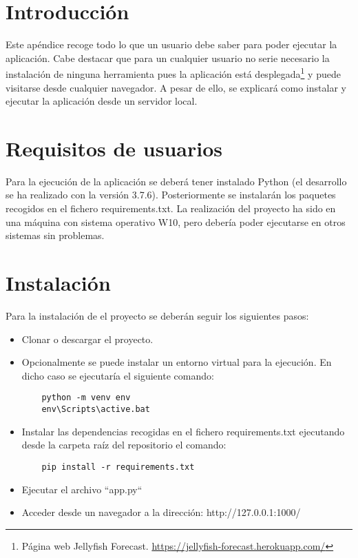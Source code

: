 
\section{Introducción}

Este apéndice recoge todo lo que un usuario debe saber para poder ejecutar la aplicación. Cabe destacar que para un cualquier usuario no serie necesario la instalación de ninguna herramienta pues la aplicación está desplegada\footnote{Página web Jellyfish Forecast. \url{https://jellyfish-forecast.herokuapp.com/}} y puede visitarse desde cualquier navegador. A pesar de ello, se explicará como instalar y ejecutar la aplicación desde un servidor local.

\section{Requisitos de usuarios}
Para la ejecución de la aplicación se deberá tener instalado Python (el desarrollo se ha realizado con la versión 3.7.6). Posteriormente se instalarán los paquetes recogidos en el fichero requirements.txt. La realización del proyecto ha sido en una máquina con sistema operativo W10, pero debería poder ejecutarse en otros sistemas sin problemas.

\section{Instalación}

Para la instalación de el proyecto se deberán seguir los siguientes pasos:

\begin{itemize}
	\item Clonar o descargar el proyecto.
	\item Opcionalmente se puede instalar un entorno virtual para la ejecución. En dicho caso se ejecutaría el siguiente comando:
	\begin{verbatim}
	python -m venv env
	env\Scripts\active.bat
	\end{verbatim}
	\item Instalar las dependencias recogidas en el fichero requirements.txt ejecutando desde la carpeta raíz del repositorio el comando:
	\begin{verbatim}
	pip install -r requirements.txt
	\end{verbatim}
	\item Ejecutar el archivo ``app.py``
	\item Acceder desde un navegador a la dirección: http://127.0.0.1:1000/
\end{itemize}

